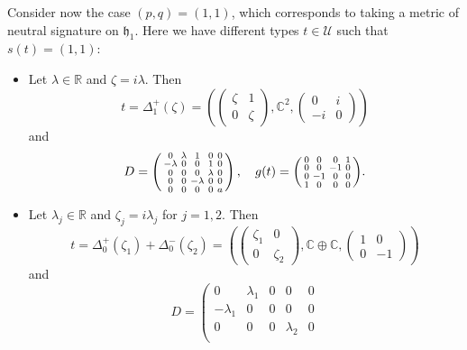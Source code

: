 \documentclass{article}
\theoremstyle{definition}
\newcommand{\R}{\mathbb{R}}
\newcommand{\C}{\mathbb{C}}
\newcommand{\frh}{\mathfrak{h}}
\newenvironment{smallpmatrix}{\left(\begin{smallmatrix}}{\end{smallmatrix}\right)}
\begin{document}
Consider now the case $(p,q)=(1,1)$, which corresponds to taking a metric of neutral signature on $\frh_1$. Here we have different types $t\in\mathcal{U}$ such that $s(t)=(1,1)$: \begin{itemize}
    \item Let $\lambda\in\R$ and $\zeta=i\lambda$. Then $$t=\Delta_1^+(\zeta)=\left(\begin{pmatrix}
        \zeta&1\\
        0&\zeta
    \end{pmatrix},\C^2,\begin{pmatrix}
        0&i\\
        -i&0
    \end{pmatrix}\right)$$ and \begin{equation}\label{6d_noniso_(1,1)-I}
        D=\left(\begin{smallmatrix}
        0 & \lambda & 1 & 0 & 0 \\
        -\lambda & 0 & 0 & 1 & 0 \\
        0 & 0 & 0 & \lambda & 0 \\
        0 & 0 & -\lambda & 0 & 0 \\
        0 & 0 & 0 & 0 & a
    \end{smallmatrix}\right),\quad g(t)=\begin{smallpmatrix}
        0 & 0 & 0 & 1 \\
        0 & 0 & -1 & 0 \\
        0 & -1 & 0 & 0 \\
        1 & 0 & 0 & 0
    \end{smallpmatrix}.\end{equation}
    \item Let $\lambda_j\in\R$ and $\zeta_j=i\lambda_j$ for $j=1,2$. Then $$t=\Delta_0^+(\zeta_1)+\Delta_0^-(\zeta_2)=\left(\begin{pmatrix}
        \zeta_1&0\\
        0&\zeta_2
    \end{pmatrix},\C\oplus\C,\begin{pmatrix}
        1&0\\
        0&-1
    \end{pmatrix}\right)$$ and \begin{equation}\label{6d_noniso_(1,1)-II}
        D=\left(\begin{smallmatrix}
        0 & \lambda_1 & 0 & 0 & 0 \\
        -\lambda_1 & 0 & 0 & 0 & 0 \\
        0 & 0 & 0 & \lambda_2 & 0 \\

\end{smallmatrix}
\end{equation}
\end{itemize}
\end{document}
